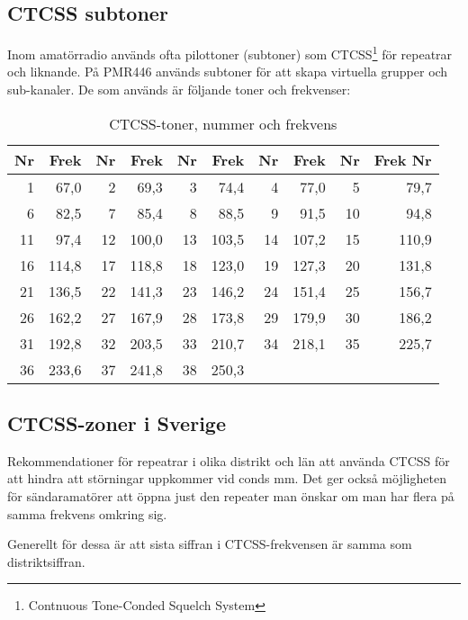 \subsection{CTCSS subtoner}

Inom amatörradio används ofta pilottoner (subtoner) som
CTCSS\footnote{Contnuous Tone-Conded Squelch System} för repeatrar och
liknande. På PMR446 används subtoner för att skapa virtuella grupper och
sub-kanaler. De som används är följande toner och frekvenser:

\begin{table}[H]
\centering
\begin{tabular}{rr|rr|rr|rr|rr}
\textbf{Nr} & \textbf{Frek} & \textbf{Nr} & \textbf{Frek} &\textbf{Nr} & \textbf{Frek} &\textbf{Nr} & \textbf{Frek} &\textbf{Nr} & \textbf{Frek} \textbf{Nr} \\ \hline
	 1 &  67,0 &  2 &  69,3 &  3 &  74,4 &  4 &  77,0 &  5 &  79,7 \\ \hline
	 6 &  82,5 &  7 &  85,4 &  8 &  88,5 &  9 &  91,5 & 10 &  94,8 \\ \hline
	11 &  97,4 & 12 & 100,0 & 13 & 103,5 & 14 & 107,2 & 15 & 110,9 \\ \hline
	16 & 114,8 & 17 & 118,8 & 18 & 123,0 & 19 & 127,3 & 20 & 131,8 \\ \hline
	21 & 136,5 & 22 & 141,3 & 23 & 146,2 & 24 & 151,4 & 25 & 156,7 \\ \hline
	26 & 162,2 & 27 & 167,9 & 28 & 173,8 & 29 & 179,9 & 30 & 186,2 \\ \hline
	31 & 192,8 & 32 & 203,5 & 33 & 210,7 & 34 & 218,1 & 35 & 225,7 \\ \hline
	36 & 233,6 & 37 & 241,8 & 38 & 250,3 &    &       &    &
\end{tabular}
\caption{CTCSS-toner, nummer och frekvens}
\end{table}

\subsection{CTCSS-zoner i Sverige}

Rekommendationer för repeatrar i olika distrikt och län att använda CTCSS för
att hindra att störningar uppkommer vid conds mm. Det ger också möjligheten
för sändaramatörer att öppna just den repeater man önskar om man har flera på
samma frekvens omkring sig.

Generellt för dessa är att sista siffran i CTCSS-frekvensen är samma som
distriktsiffran.

